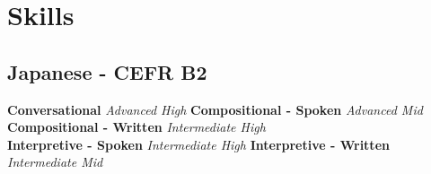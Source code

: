 \documentclass[letterpaper]{deedy-resume_sm} %
\begin{document}
\section{Skills}
\subsection{Japanese - CEFR B2}
\textbf{Conversational} {\footnotesize \textit{Advanced High}} \textbullet{}
\textbf{Compositional - Spoken} {\footnotesize \textit{Advanced Mid}} \textbullet{}
\textbf{Compositional - Written} {\footnotesize \textit{Intermediate High}} \\
\textbf{Interpretive - Spoken} {\footnotesize \textit{Intermediate High}} \textbullet{}
\textbf{Interpretive - Written} {\footnotesize \textit{Intermediate Mid}}
\end{document}
